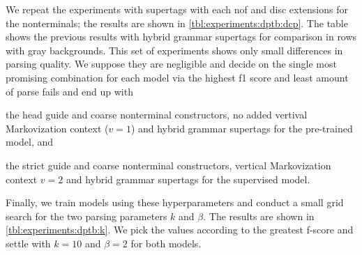 \documentclass[../../document.tex]{subfiles}
\begin{document}
    We repeat the experiments with  supertags with each nof and disc extensions for the nonterminals; the results are shown in \cref{tbl:experiments:dptb:dcp}.
    The table shows the previous results with hybrid grammar supertags for comparison in rows with gray backgrounds.
    This set of experiments shows only small differences in parsing quality.
    We suppose they are negligible and decide on the single most promising combination for each model via the highest f1 score and least amount of parse fails and end up with
    \begin{compactitem}
        \item the head guide and coarse nonterminal constructors, no added vertival Markovization context ($v=1$) and hybrid grammar supertags for the pre-trained model, and
        \item the strict guide and coarse nonterminal constructors, vertical Markovization context \(v=2\) and hybrid grammar supertags for the supervised model.
    \end{compactitem}
    Finally, we train models using these hyperparameters and conduct a small grid search for the two parsing parameters \(k\) and \(\beta\). The results are shown in \cref{tbl:experiments:dptb:k}.
    We pick the values according to the greatest f-score and settle with \(k=10\) and \(\beta=2\) for both models.
\end{document}
